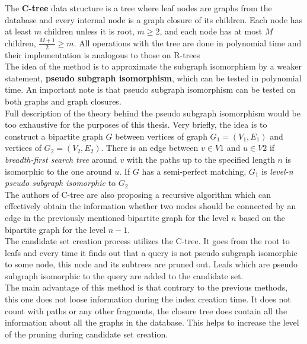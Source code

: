 The \textbf{C-tree} data structure is a tree where leaf nodes are graphs from the database and every internal node is a graph closure of its children. Each node has at least $ m $ children unless it is root, $ m \geq 2 $, and each node has at most $ M $ children, $ \frac{M+1}{2} \geq m $. All operations with the tree are done in polynomial time and their implementation is analogous to those on R-trees \cite{RTrees}\\

The idea of the method is to approximate the subgraph isomorphism by a weaker statement, \textbf{pseudo subgraph isomorphism}, which can be tested in polynomial time. An important note is that pseudo subgraph isomorphism can be tested on both graphs and graph closures.\\

Full description of the theory behind the pseudo subgraph isomorphism would be too exhaustive for the purposes of this thesis. Very briefly, the idea is to construct a bipartite graph $G$ between vertices of graph $G_{1}=(V_{1}, E_{1})$ and vertices of $G_{2}=(V_{2}, E_{2})$. There is an edge between $v \in V1$ and $u \in V2$ if \textit{breadth-first search tree} around $v$ with the paths up to the specified length $n$ is isomorphic to the one around $u$. If $G$ has a semi-perfect matching, $G_{1}$ is \textit{level-n pseudo subgraph isomorphic} to $G_{2}$\\

The authors of C-tree are also proposing a recursive algorithm which can effectively obtain the information whether two nodes should be connected by an edge in the previously mentioned bipartite graph for the level $n$ based on the bipartite graph for the level $n-1$.\\

The candidate set creation process utilizes the C-tree. It goes from the root to leafs and every time it finds out that a query is not pseudo subgraph isomorphic to some node, this node and its subtrees are pruned out. Leafs which are pseudo subgraph isomorphic to the query are added to the candidate set.\\

The main advantage of this method is that contrary to the previous methods, this one does not loose information during the index creation time. It does not count with paths or any other fragments, the closure tree does contain all the information about all the graphs in the database. This helps to increase the level of the pruning during candidate set creation.

